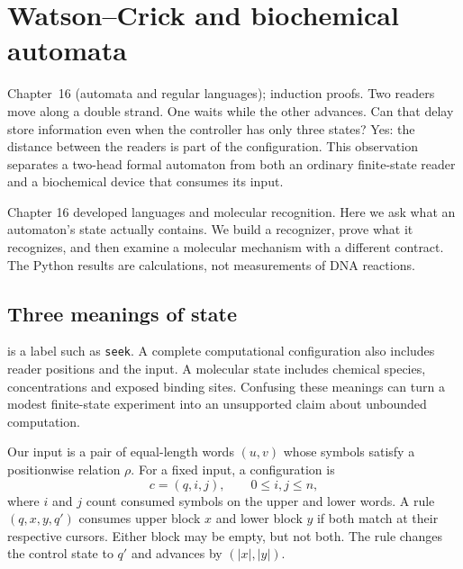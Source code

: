 \chapter{Watson--Crick and biochemical automata}
{Chapter~16 (automata and regular languages); induction proofs.}
Two readers move along a double strand. One waits while the other advances.
Can that delay store information even when the controller has only three
states? Yes: the distance between the readers is part of the configuration.
This observation separates a two-head formal automaton from both an ordinary
finite-state reader and a biochemical device that consumes its input.

Chapter 16 developed languages and molecular recognition. Here we ask what an
automaton's state actually contains. We build a recognizer, prove what it
recognizes, and then examine a molecular mechanism with a different contract.
The Python results are calculations, not measurements of DNA reactions.

\section{Three meanings of state}
 is a label such as \texttt{seek}. A complete computational
configuration also includes reader positions and the input. A molecular state
includes chemical species, concentrations and exposed binding sites. Confusing
these meanings can turn a modest finite-state experiment into an unsupported
claim about unbounded computation.

Our input is a pair of equal-length words $(u,v)$ whose symbols satisfy a
positionwise relation $\rho$. For a fixed input, a configuration is
\begin{equation}
 c=(q,i,j),\qquad 0\leq i,j\leq n,
\end{equation}
where $i$ and $j$ count consumed symbols on the upper and lower words.
A rule $(q,x,y,q')$ consumes upper block $x$ and lower block $y$ if both
match at their respective cursors. Either block may be empty, but not both.
The rule changes the control state to $q'$ and advances by $(|x|,|y|)$.

